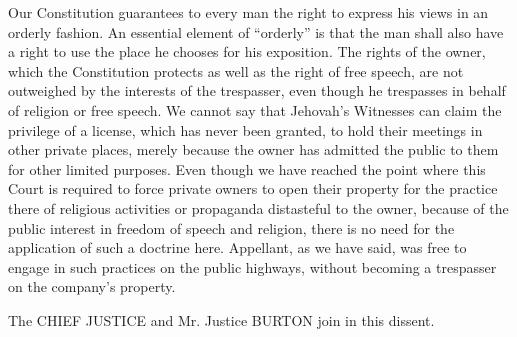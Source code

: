 Our Constitution guarantees to every man the right to express his views in an
orderly fashion. An essential element of ``orderly'' is that the man shall also
have a right to use the place he chooses for his exposition. The rights of the
owner, which the Constitution protects as well as the right of free speech, are
not outweighed by the interests of the trespasser, even though he trespasses in
behalf of religion or free speech. We cannot say that Jehovah's Witnesses can
claim the privilege of a license, which has never been granted, to hold their
meetings in other private places, merely because the owner has admitted the
public to them for other limited purposes. Even though we have reached the
point where this Court is required to force private owners to open their
property for the practice there of religious activities or propaganda
distasteful\textbf{} to the owner, because of the public interest in freedom of
speech and religion, there is no need for the application of such a doctrine
here. Appellant, as we have said, was free to engage in such practices on the
public highways, without becoming a trespasser on the company's property.

The CHIEF JUSTICE and Mr. Justice BURTON join in this dissent.


